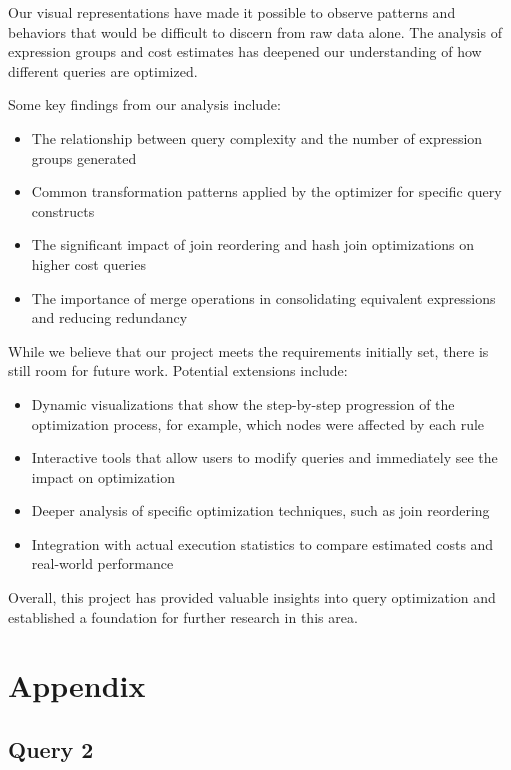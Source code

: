 \documentclass[a4paper,12pt]{scrreprt}
\begin{document}
Our visual representations have made it possible to observe patterns and behaviors that would be difficult to discern from raw data alone. The analysis of expression groups and cost estimates has deepened our understanding of how different queries are optimized.

Some key findings from our analysis include:
\begin{itemize}
    \item The relationship between query complexity and the number of expression groups generated
    \item Common transformation patterns applied by the optimizer for specific query constructs
    \item The significant impact of join reordering and hash join optimizations on higher cost queries
    \item The importance of merge operations in consolidating equivalent expressions and reducing redundancy
\end{itemize}

While we believe that our project meets the requirements initially set, there is still room for future work. Potential extensions include:
\begin{itemize}
    \item Dynamic visualizations that show the step-by-step progression of the optimization process, for example, which nodes were affected by each rule
    \item Interactive tools that allow users to modify queries and immediately see the impact on optimization
    \item Deeper analysis of specific optimization techniques, such as join reordering
    \item Integration with actual execution statistics to compare estimated costs and real-world performance
\end{itemize}

Overall, this project has provided valuable insights into query optimization and established a foundation for further research in this area.

\appendix

\chapter{Appendix}
\thispagestyle{fancy}

\section{Query 2}\label{subsec:query2}
\end{document}

